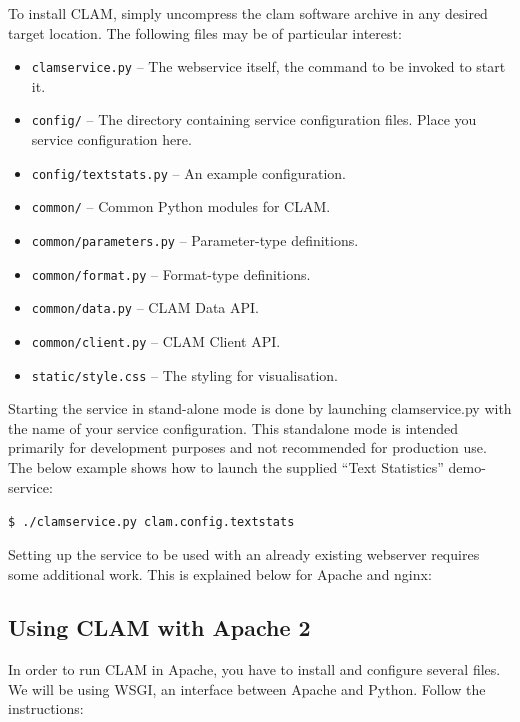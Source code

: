 \documentclass[a4paper,12pt]{report}
\begin{document}
To install CLAM, simply uncompress the clam software archive in any desired target location. The following files may be of particular interest:

\begin{itemize}
\item \texttt{clamservice.py} -- The webservice itself, the command to be invoked to start it.
\item \texttt{config/} -- The directory containing service configuration files. Place you service configuration here.
\item \texttt{config/textstats.py} -- An example configuration.
\item \texttt{common/} -- Common Python modules for CLAM.
\item \texttt{common/parameters.py} -- Parameter-type definitions.
\item \texttt{common/format.py} -- Format-type definitions.
\item \texttt{common/data.py} -- CLAM Data API.
\item \texttt{common/client.py} -- CLAM Client API.
\item \texttt{static/style.css} -- The styling for visualisation.
\end{itemize}

Starting the service in stand-alone mode is done by launching clamservice.py with the name of your service configuration. This standalone mode is intended primarily for development purposes and not recommended for production use. The below example shows how to launch the supplied ``Text Statistics'' demo-service:

\texttt{\$ ./clamservice.py clam.config.textstats}

Setting up the service to be used with an already existing webserver requires some additional work. This is explained below for Apache and nginx:

\subsection{Using CLAM with Apache 2}

In order to run CLAM in Apache, you have to install and configure several files. We will be using WSGI, an interface between Apache and Python. Follow the instructions:
\end{document}
